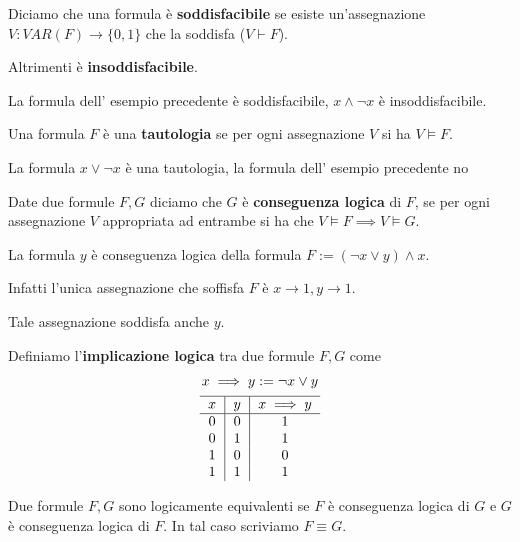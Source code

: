 \documentclass[10pt,a4paper,twoside]{book}
\begin{document}
\begin{definition}
    Diciamo che una formula è \textbf{soddisfacibile} se esiste un'assegnazione $V: VAR(F) \rightarrow \{0,1\}$ che la soddisfa ($V \vdash F$).

    Altrimenti è \textbf{insoddisfacibile}.
\end{definition}
La formula dell' esempio precedente è soddisfacibile, $x \land \neg x$ è insoddisfacibile.

\begin{definition}[Tautologia]
    Una formula $F$ è una \textbf{tautologia} se per ogni assegnazione $V$ si ha $V \vDash F$.
\end{definition}
La formula $x \lor \neg x$ è una tautologia, la formula dell' esempio precedente no

\begin{definition}
    Date due formule $F,G$ diciamo che $G$ è \textbf{conseguenza logica} di $F$, se per ogni assegnazione $V$ appropriata ad entrambe si ha che $V \vDash F \implies V \vDash G$.
\end{definition}
\begin{example}
    La formula $y$ è conseguenza logica della formula $F := (\neg x \lor y) \land x$.

    Infatti l'unica assegnazione che soffisfa $F$ è $x \rightarrow 1, y \rightarrow 1$.

    Tale assegnazione soddisfa anche $y$.
\end{example}
\begin{definition}
    Definiamo l'\textbf{implicazione logica} tra due formule $F,G$ come
    \begin{gather*}
        x \implies y := \neg x \lor y \\
        \begin{tabular}{c|c|c}
            \hline
            $x$ & $y$ & $x \implies y$ \\
            \hline
            0   & 0   & 1              \\
            0   & 1   & 1              \\
            1   & 0   & 0              \\
            1   & 1   & 1              \\
        \end{tabular}
    \end{gather*}
\end{definition}
\begin{definition}
    Due formule $F,G$ sono logicamente equivalenti se $F$ è conseguenza logica di $G$ e $G$ è conseguenza logica di $F$. In tal caso scriviamo $F \equiv G$.
\end{definition}
\end{document}

